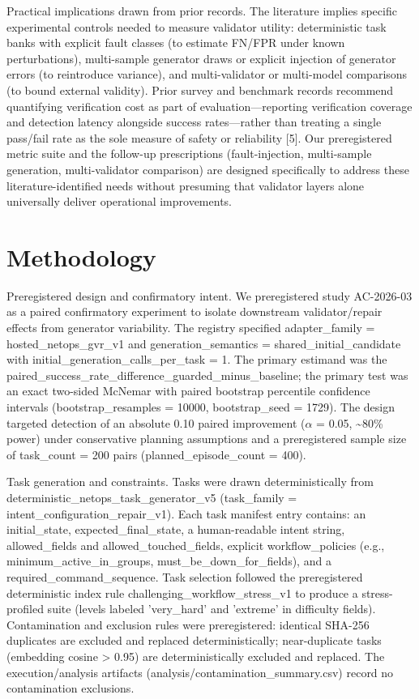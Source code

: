 \documentclass[conference]{IEEEtran}
\begin{document}
Practical implications drawn from prior records. The literature implies specific experimental controls needed to measure validator utility: deterministic task banks with explicit fault classes (to estimate FN/FPR under known perturbations), multi-sample generator draws or explicit injection of generator errors (to reintroduce variance), and multi-validator or multi-model comparisons (to bound external validity). Prior survey and benchmark records recommend quantifying verification cost as part of evaluation---reporting verification coverage and detection latency alongside success rates---rather than treating a single pass/fail rate as the sole measure of safety or reliability [5]. Our preregistered metric suite and the follow-up prescriptions (fault-injection, multi-sample generation, multi-validator comparison) are designed specifically to address these literature-identified needs without presuming that validator layers alone universally deliver operational improvements.

\section{Methodology}
Preregistered design and confirmatory intent. We preregistered study AC-2026-03 as a paired confirmatory experiment to isolate downstream validator/repair effects from generator variability. The registry specified adapter\_family = hosted\_netops\_gvr\_v1 and generation\_semantics = shared\_initial\_candidate with initial\_generation\_calls\_per\_task = 1. The primary estimand was the paired\_success\_rate\_difference\_guarded\_minus\_baseline; the primary test was an exact two-sided McNemar with paired bootstrap percentile confidence intervals (bootstrap\_resamples = 10000, bootstrap\_seed = 1729). The design targeted detection of an absolute 0.10 paired improvement (\ensuremath{\alpha} = 0.05, \textasciitilde{}80\% power) under conservative planning assumptions and a preregistered sample size of task\_count = 200 pairs (planned\_episode\_count = 400).

Task generation and constraints. Tasks were drawn deterministically from deterministic\_netops\_task\_generator\_v5 (task\_family = intent\_configuration\_repair\_v1). Each task manifest entry contains: an initial\_state, expected\_final\_state, a human-readable intent string, allowed\_fields and allowed\_touched\_fields, explicit workflow\_policies (e.g., minimum\_active\_in\_groups, must\_be\_down\_for\_fields), and a required\_command\_sequence. Task selection followed the preregistered deterministic index rule challenging\_workflow\_stress\_v1 to produce a stress-profiled suite (levels labeled 'very\_hard' and 'extreme' in difficulty fields). Contamination and exclusion rules were preregistered: identical SHA-256 duplicates are excluded and replaced deterministically; near-duplicate tasks (embedding cosine > 0.95) are deterministically excluded and replaced. The execution/analysis artifacts (analysis/contamination\_summary.csv) record no contamination exclusions.
\end{document}
